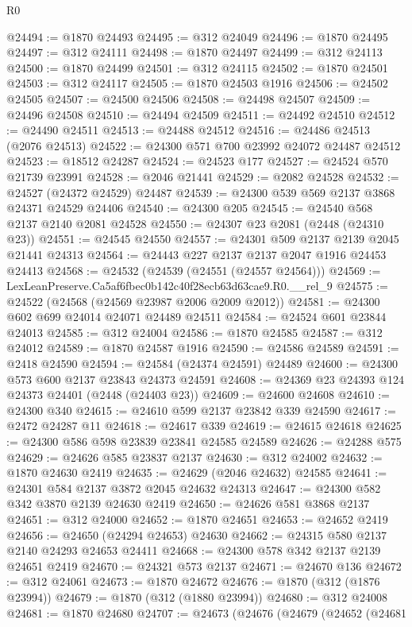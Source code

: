 \begin{lexlean}{R0}
\begin{coremodule}
@24494 := @1870 @24493
@24495 := @312 @24049
@24496 := @1870 @24495
@24497 := @312 @24111
@24498 := @1870 @24497
@24499 := @312 @24113
@24500 := @1870 @24499
@24501 := @312 @24115
@24502 := @1870 @24501
@24503 := @312 @24117
@24505 := @1870 @24503 @1916
@24506 := @24502 @24505
@24507 := @24500 @24506
@24508 := @24498 @24507
@24509 := @24496 @24508
@24510 := @24494 @24509
@24511 := @24492 @24510
@24512 := @24490 @24511
@24513 := @24488 @24512
@24516 := @24486 @24513 (@2076 @24513)
@24522 := @24300 @571 @700 @23992 @24072 @24487 @24512
@24523 := @18512 @24287
@24524 := @24523 @177
@24527 := @24524 @570 @21739 @23991
@24528 := @2046 @21441
@24529 := @2082 @24528
@24532 := @24527 (@24372 @24529) @24487
@24539 := @24300 @539 @569 @2137 @3868 @24371 @24529 @24406
@24540 := @24300 @205
@24545 := @24540 @568 @2137 @2140 @2081 @24528
@24550 := @24307 @23 @2081 (@2448 (@24310 @23))
@24551 := @24545 @24550
@24557 := @24301 @509 @2137 @2139 @2045 @21441 @24313
@24564 := @24443 @227 @2137 @2137 @2047 @1916 @24453 @24413
@24568 := @24532 (@24539 (@24551 (@24557 @24564)))
@24569 := LexLeanPreserve.Ca5af6fbec0b142c40f28ecb63d63cae9.R0.__rel_9
@24575 := @24522 (@24568 (@24569 @23987 @2006 @2009 @2012))
@24581 := @24300 @602 @699 @24014 @24071 @24489 @24511
@24584 := @24524 @601 @23844 @24013
@24585 := @312 @24004
@24586 := @1870 @24585
@24587 := @312 @24012
@24589 := @1870 @24587 @1916
@24590 := @24586 @24589
@24591 := @2418 @24590
@24594 := @24584 (@24374 @24591) @24489
@24600 := @24300 @573 @600 @2137 @23843 @24373 @24591
@24608 := @24369 @23 @24393 @124 @24373 @24401 (@2448 (@24403 @23))
@24609 := @24600 @24608
@24610 := @24300 @340
@24615 := @24610 @599 @2137 @23842 @339 @24590
@24617 := @2472 @24287 @11
@24618 := @24617 @339
@24619 := @24615 @24618
@24625 := @24300 @586 @598 @23839 @23841 @24585 @24589
@24626 := @24288 @575
@24629 := @24626 @585 @23837 @2137
@24630 := @312 @24002
@24632 := @1870 @24630 @2419
@24635 := @24629 (@2046 @24632) @24585
@24641 := @24301 @584 @2137 @3872 @2045 @24632 @24313
@24647 := @24300 @582 @342 @3870 @2139 @24630 @2419
@24650 := @24626 @581 @3868 @2137
@24651 := @312 @24000
@24652 := @1870 @24651
@24653 := @24652 @2419
@24656 := @24650 (@24294 @24653) @24630
@24662 := @24315 @580 @2137 @2140 @24293 @24653 @24411
@24668 := @24300 @578 @342 @2137 @2139 @24651 @2419
@24670 := @24321 @573 @2137
@24671 := @24670 @136
@24672 := @312 @24061
@24673 := @1870 @24672
@24676 := @1870 (@312 (@1876 @23994))
@24679 := @1870 (@312 (@1880 @23994))
@24680 := @312 @24008
@24681 := @1870 @24680
@24707 := @24673
    (@24676
      (@24679
        (@24652
          (@24681

\end{coremodule}
\end{lexlean}
